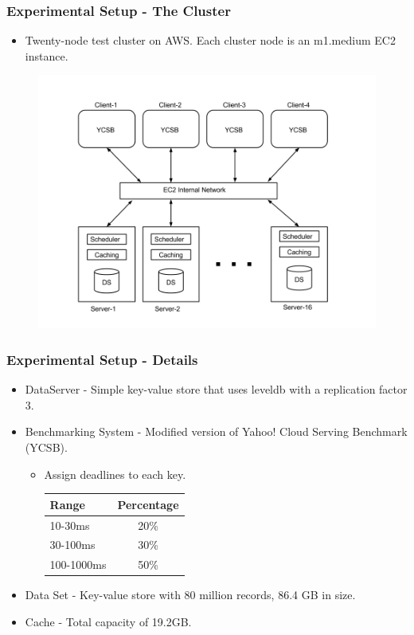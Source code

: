 \documentclass{beamer}
\begin{document}
\begin{frame}
  \frametitle{Experimental Setup - The Cluster}
  \begin{itemize}
  \item Twenty-node test cluster on AWS. Each cluster node is an m1.medium
    EC2 instance.
  \end{itemize}
  \begin{figure}
    \begin{center}
      \centerline{\includegraphics[scale=0.25]{img/Experimental_Setup.png}}
    \end{center}
  \end{figure}
\end{frame}

\begin{frame}
  \frametitle{Experimental Setup - Details}
  \begin{itemize}
  \item DataServer - Simple key-value store that uses leveldb with a
    replication factor 3.
  \item Benchmarking System - Modified version of Yahoo! Cloud Serving
    Benchmark (YCSB).
    \begin{itemize}
    \item Assign deadlines to each key.\\
      \begin{tabular}{| l | c |}
        \hline
        Range & Percentage \\ \hline
        10-30ms & 20\% \\ \hline
        30-100ms & 30\% \\ \hline
        100-1000ms & 50\% \\ \hline
      \end{tabular}
    \end{itemize}
  \item Data Set - Key-value store with 80 million records, 86.4 GB in size.
  \item Cache - Total capacity of 19.2GB.
  \end{itemize}
\end{frame}
\end{document}
